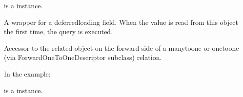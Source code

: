 \documentclass[letterpaper,10pt,english]{sphinxmanual}
\begin{document}
\begin{fulllineitems}
\begin{fulllineitems}
 is a  instance.

\end{fulllineitems}


\begin{fulllineitems}
\label{\detokenize{forums:forums.models.LikeComment2.comment2_id}}
\end{fulllineitems}


\begin{fulllineitems}
\label{\detokenize{forums:forums.models.LikeComment2.id}}
A wrapper for a deferred\sphinxhyphen{}loading field. When the value is read from this
object the first time, the query is executed.

\end{fulllineitems}


\begin{fulllineitems}
\label{\detokenize{forums:forums.models.LikeComment2.liker}}
Accessor to the related object on the forward side of a many\sphinxhyphen{}to\sphinxhyphen{}one or
one\sphinxhyphen{}to\sphinxhyphen{}one (via ForwardOneToOneDescriptor subclass) relation.

In the example:

\begin{sphinxVerbatim}[commandchars=\\\{\}]
 
       
\end{sphinxVerbatim}

 is a  instance.


\end{fulllineitems}
\end{fulllineitems}
\end{document}
